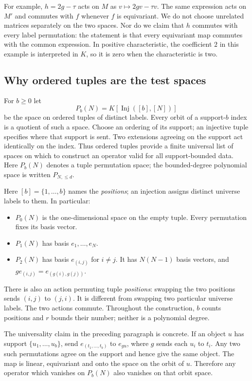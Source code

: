 \documentclass[11pt,a4paper,oneside,openany]{book}
\theoremstyle{definition}\newtheorem{definition}[theorem]{Definition}
\theoremstyle{remark}\newtheorem{remark}[theorem]{Remark}
\DeclareMathOperator{\Inj}{Inj}
\numberwithin{equation}{chapter}
\begin{document}
For example, $h=2g-\tau$ acts on $M$ as
$v\mapsto2g v-\tau v$. The same expression acts on $M'$ and
commutes with $f$ whenever $f$ is equivariant. We do not choose
unrelated matrices separately on the two spaces. Nor do we claim
that $h$ commutes with every label permutation: the statement is
that every equivariant map commutes with the common expression.
In positive characteristic, the coefficient $2$ in this example is
interpreted in $K$, so it is zero when the characteristic is two.

\subsection*{Why ordered tuples are the test spaces}
For $b\ge0$ let
\[
                 P_b(N)=K[\Inj([b],[N])]
\]
be the space on ordered tuples of distinct labels. Every orbit of a
support-$b$ index is a quotient of such a space. Choose an ordering of
its support; an injective tuple specifies where that support is sent.
Two extensions agreeing on the support act identically on the index.
Thus ordered tuples provide a finite universal list of spaces on which
to construct an operator valid for all support-bounded data.
Here $P_b(N)$ denotes a tuple permutation space; the bounded-degree
polynomial space is written $P_{N,\le d}$.

Here $[b]=\{1,\ldots,b\}$ names the \emph{positions}; an injection
assigns distinct universe labels to them. In particular:
\begin{itemize}
\item $P_0(N)$ is the one-dimensional space on the empty tuple.
Every permutation fixes its basis vector.
\item $P_1(N)$ has basis $e_1,\ldots,e_N$.
\item $P_2(N)$ has basis $e_{(i,j)}$ for $i\ne j$. It has
$N(N-1)$ basis vectors, and $g e_{(i,j)}=e_{(g(i),g(j))}$.
\end{itemize}
There is also an action permuting tuple \emph{positions}: swapping
the two positions sends $(i,j)$ to $(j,i)$. It is different from
swapping two particular universe labels. The two actions commute.
Throughout the construction, $b$ counts positions and $r$ bounds
their number; neither is a polynomial degree.

The universality claim in the preceding paragraph is concrete. If an
object $u$ has support $\{u_1,\ldots,u_b\}$, send
$e_{(t_1,\ldots,t_b)}$ to $e_{g u}$, where $g$ sends each $u_i$
to $t_i$. Any two such permutations agree on the support and hence
give the same object. The map is linear, equivariant and onto the
space on the orbit of $u$. Therefore any operator which vanishes on
$P_b(N)$ also vanishes on that orbit space.
\end{document}
